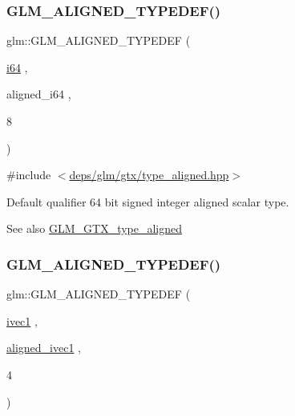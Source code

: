 \subsubsection{\texorpdfstring{G\+L\+M\+\_\+\+A\+L\+I\+G\+N\+E\+D\+\_\+\+T\+Y\+P\+E\+D\+E\+F()}{GLM\_ALIGNED\_TYPEDEF()}\hspace{0.1cm}{\footnotesize\ttfamily [48/209]}}
{\footnotesize\ttfamily glm\+::\+G\+L\+M\+\_\+\+A\+L\+I\+G\+N\+E\+D\+\_\+\+T\+Y\+P\+E\+D\+EF (\begin{DoxyParamCaption}\item[{\hyperlink{group__gtc__type__precision_gac7a7eaad46064fc952b06df33689da23}{i64}}]{,  }\item[{aligned\+\_\+i64}]{,  }\item[{8}]{ }\end{DoxyParamCaption})}



{\ttfamily \#include $<$\hyperlink{gtx_2type__aligned_8hpp}{deps/glm/gtx/type\+\_\+aligned.\+hpp}$>$}

Default qualifier 64 bit signed integer aligned scalar type. \begin{DoxySeeAlso}{See also}
\hyperlink{group__gtx__type__aligned}{G\+L\+M\+\_\+\+G\+T\+X\+\_\+type\+\_\+aligned} 
\end{DoxySeeAlso}
\mbox{\label{group__gtx__type__aligned_gaaad735483450099f7f882d4e3a3569bd}} 
\subsubsection{\texorpdfstring{G\+L\+M\+\_\+\+A\+L\+I\+G\+N\+E\+D\+\_\+\+T\+Y\+P\+E\+D\+E\+F()}{GLM\_ALIGNED\_TYPEDEF()}\hspace{0.1cm}{\footnotesize\ttfamily [49/209]}}
{\footnotesize\ttfamily glm\+::\+G\+L\+M\+\_\+\+A\+L\+I\+G\+N\+E\+D\+\_\+\+T\+Y\+P\+E\+D\+EF (\begin{DoxyParamCaption}\item[{\hyperlink{gtc_2vec1_8hpp_a946031cea0c22745848ebd873e6facb0}{ivec1}}]{,  }\item[{\hyperlink{group__gtc__type__aligned_gafe9657c41fa58e912f99e92284d79fce}{aligned\+\_\+ivec1}}]{,  }\item[{4}]{ }\end{DoxyParamCaption})}



